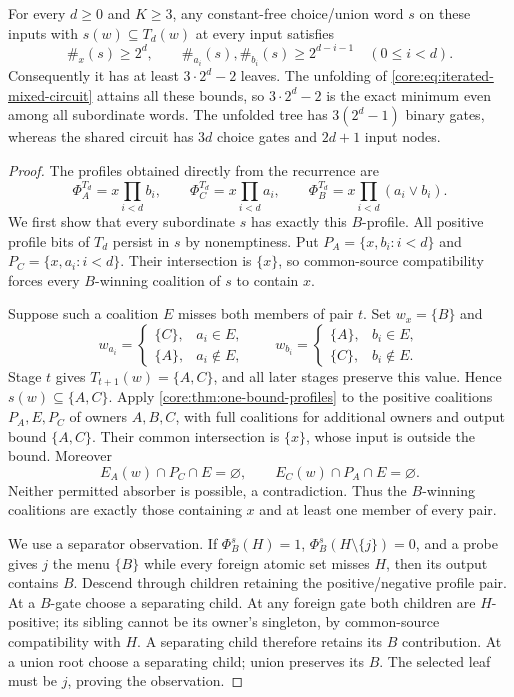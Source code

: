 \begin{theorem}
\label{core:thm:robust-tree-size}
For every $d\geq0$ and $K\geq3$, any constant-free choice/union word
$s$ on these inputs with $s(w)\subseteq T_d(w)$ at every input satisfies
\[
 \#_x(s)\geq2^d,\qquad
 \#_{a_i}(s),\#_{b_i}(s)\geq2^{d-i-1}\quad(0\leq i<d).
\]
Consequently it has at least $3\cdot2^d-2$ leaves. The unfolding of
\eqref{core:eq:iterated-mixed-circuit} attains all these bounds, so
$3\cdot2^d-2$ is the exact minimum even among all subordinate words.
The unfolded tree has $3(2^d-1)$ binary gates, whereas the shared circuit has $3d$
choice gates and $2d+1$ input nodes.
\end{theorem}
\begin{proof}
The profiles obtained directly from the recurrence are
\[
 \Phi_A^{T_d}=x\prod_{i<d}b_i,\qquad
 \Phi_C^{T_d}=x\prod_{i<d}a_i,\qquad
 \Phi_B^{T_d}=x\prod_{i<d}(a_i\vee b_i).
\]
We first show that every subordinate $s$ has exactly this $B$-profile.
All positive profile bits of $T_d$ persist in $s$ by nonemptiness.
Put $P_A=\{x,b_i:i<d\}$ and $P_C=\{x,a_i:i<d\}$.
Their intersection is $\{x\}$, so common-source compatibility forces
every $B$-winning coalition of $s$ to contain $x$.

Suppose such a coalition $E$ misses both members of pair $t$.
Set $w_x=\{B\}$ and
\[
 w_{a_i}=\begin{cases}\{C\},&a_i\in E,\\\{A\},&a_i\notin E,\end{cases}
 \qquad
 w_{b_i}=\begin{cases}\{A\},&b_i\in E,\\\{C\},&b_i\notin E.\end{cases}
\]
Stage $t$ gives $T_{t+1}(w)=\{A,C\}$, and all later stages preserve
this value. Hence $s(w)\subseteq\{A,C\}$.
Apply \cref{core:thm:one-bound-profiles} to the positive coalitions
$P_A,E,P_C$ of owners $A,B,C$, with full coalitions for additional
owners and output bound $\{A,C\}$. Their common intersection is
$\{x\}$, whose input is outside the bound. Moreover
\[
 E_A(w)\cap P_C\cap E=\varnothing,
 \qquad E_C(w)\cap P_A\cap E=\varnothing.
\]
Neither permitted absorber is possible, a contradiction. Thus the
$B$-winning coalitions are exactly those containing $x$ and at least
one member of every pair.

We use a separator observation. If
$\Phi_B^s(H)=1$, $\Phi_B^s(H\setminus\{j\})=0$, and a probe gives
$j$ the menu $\{B\}$ while every foreign atomic set misses $H$,
then its output contains $B$. Descend through children retaining the
positive/negative profile pair. At a $B$-gate choose a separating
child. At any foreign gate both children are $H$-positive; its
sibling cannot be its owner's singleton, by common-source compatibility
with $H$. A separating child therefore retains its $B$ contribution.
At a union root choose a separating child; union preserves its $B$.
The selected leaf must be $j$, proving the observation.


\end{proof}
